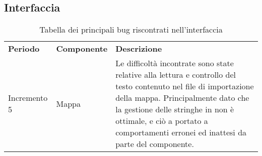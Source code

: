\subsection{Interfaccia}

\begin{table} [!ht]
	\begin{center}
		\begin{tabular} { m{2.5cm} m{2.5cm} m{11cm}  }
			\rowcolor{lightgray}
			\textbf{Periodo} & \textbf{Componente} & \textbf{Descrizione}\\
			
			Incremento 5 & Mappa & Le difficoltà incontrate sono state relative alla lettura e controllo del testo contenuto nel file di importazione della mappa. Principalmente dato che la gestione delle stringhe in \glock{Javascript} non è ottimale, e ciò a portato a comportamenti erronei ed inattesi da parte del componente. \\
			
		\end{tabular}
	\end{center}
	\caption{Tabella dei principali bug riscontrati nell'interfaccia}
\end{table}